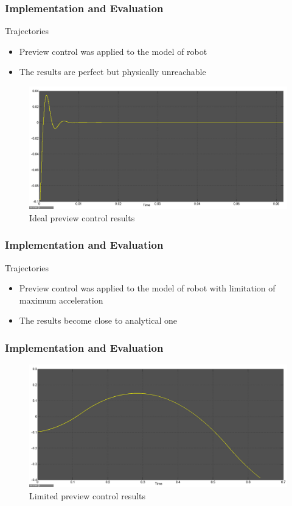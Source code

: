 \documentclass{beamer}
\begin{document}
	\begin{frame}
		\frametitle{Implementation and Evaluation}
		\begin{block}{Trajectories}
			\begin{itemize}
				\item
					Preview control was applied to the model of robot
				\item
					The results are perfect but physically unreachable
			\end{itemize}
		\end{block}
		
		\begin{figure}[h!]
			\centering
			\includegraphics[width=0.68\linewidth]{presentation_images/28}
			\caption{Ideal preview control results}
		\end{figure}
	\end{frame}
	

	\begin{frame}
		\frametitle{Implementation and Evaluation}
		\begin{block}{Trajectories}
			\begin{itemize}
				\item
					Preview control was applied to the model of robot with limitation of maximum acceleration
				\item
					The results become close to analytical one
			\end{itemize}
		\end{block}
	\end{frame}
	

	\begin{frame}
		\frametitle{Implementation and Evaluation}
		\begin{figure}[h!]
			\centering
			\includegraphics[width=0.8\linewidth]{presentation_images/29}
			\caption{Limited preview control results}
		\end{figure}
	\end{frame}
	
\end{document}
